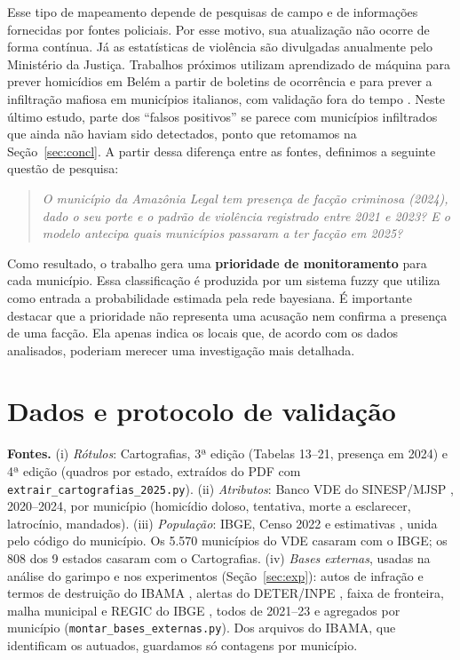 \documentclass[10pt,a4paper,twocolumn]{article}
\begin{document}
Esse tipo de mapeamento depende de pesquisas de campo e de informações fornecidas por fontes policiais. Por esse motivo, sua atualização não ocorre de forma contínua. Já as estatísticas de violência são divulgadas anualmente pelo Ministério da Justiça. Trabalhos próximos utilizam aprendizado de máquina para prever homicídios em Belém a partir de boletins de ocorrência \cite{ribeiro} e para prever a infiltração mafiosa em municípios italianos, com validação fora do tempo \cite{campedelli}. Neste último estudo, parte dos ``falsos positivos'' se parece com municípios infiltrados que ainda não haviam sido detectados, ponto que retomamos na Seção~\ref{sec:concl}. A partir dessa diferença entre as fontes, definimos a seguinte questão de pesquisa:

\begin{quote}\itshape
O município da Amazônia Legal tem presença de facção criminosa (2024), dado o seu porte e o
padrão de violência registrado entre 2021 e 2023? E o modelo antecipa quais municípios passaram
a ter facção em 2025?
\end{quote}

Como resultado, o trabalho gera uma \textbf{prioridade de monitoramento} para cada município. Essa classificação é produzida por um sistema fuzzy que utiliza como entrada a probabilidade estimada pela rede bayesiana. É importante destacar que a prioridade não representa uma acusação nem confirma a presença de uma facção. Ela apenas indica os locais que, de acordo com os dados analisados, poderiam merecer uma investigação mais detalhada.

\section{Dados e protocolo de validação}
\textbf{Fontes.} (i) \emph{Rótulos}: Cartografias, 3ª edição \cite{carto3} (Tabelas 13--21, presença em
2024) e 4ª edição \cite{carto4} (quadros por estado, extraídos do PDF com
\texttt{extrair\_cartografias\_2025.py}). (ii) \emph{Atributos}: Banco VDE do SINESP/MJSP
\cite{vde}, 2020--2024, por município (homicídio doloso, tentativa, morte a esclarecer,
latrocínio, mandados). (iii) \emph{População}: IBGE, Censo 2022 e estimativas \cite{ibge}, unida pelo
código do município. Os 5.570 municípios do VDE casaram com o IBGE; os 808 dos 9 estados casaram
com o Cartografias. (iv) \emph{Bases externas}, usadas na análise do garimpo e nos experimentos
(Seção~\ref{sec:exp}): autos de infração e termos de destruição do IBAMA \cite{ibama}, alertas do
DETER/INPE \cite{deter}, faixa de fronteira, malha municipal e REGIC do IBGE \cite{ibge}, todos de
2021--23 e agregados por município (\texttt{montar\_bases\_externas.py}). Dos arquivos do IBAMA,
que identificam os autuados, guardamos só contagens por município.
\end{document}
